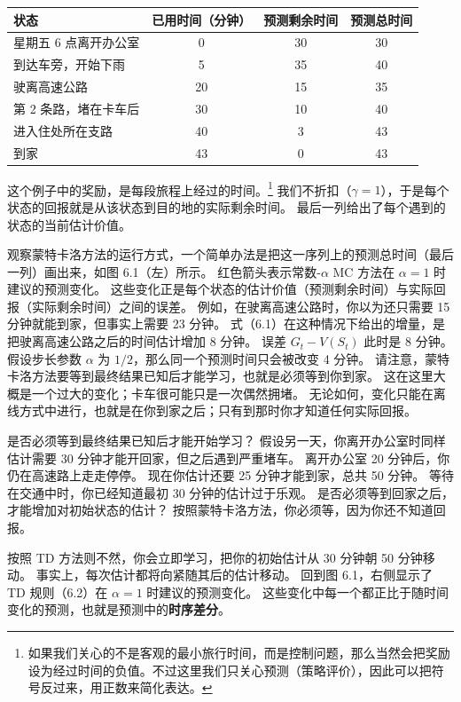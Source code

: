 \documentclass[UTF8, 12pt, fontset=fandol, oneside]{ctexart}
\begin{document}
\begin{center}
\begin{tabular}{lccc}
\toprule
状态 & 已用时间（分钟） & 预测剩余时间 & 预测总时间 \\
\midrule
星期五 6 点离开办公室 & 0 & 30 & 30 \\
到达车旁，开始下雨 & 5 & 35 & 40 \\
驶离高速公路 & 20 & 15 & 35 \\
第 2 条路，堵在卡车后 & 30 & 10 & 40 \\
进入住处所在支路 & 40 & 3 & 43 \\
到家 & 43 & 0 & 43 \\
\bottomrule
\end{tabular}
\end{center}

这个例子中的奖励，是每段旅程上经过的时间。\footnote{如果我们关心的不是客观的最小旅行时间，而是控制问题，那么当然会把奖励设为经过时间的负值。不过这里我们只关心预测（策略评价），因此可以把符号反过来，用正数来简化表达。}
我们不折扣（$\gamma=1$），于是每个状态的回报就是从该状态到目的地的实际剩余时间。
最后一列给出了每个遇到的状态的当前估计价值。

观察蒙特卡洛方法的运行方式，一个简单办法是把这一序列上的预测总时间（最后一列）画出来，如图 6.1（左）所示。
红色箭头表示常数-$\alpha$ MC 方法在 $\alpha=1$ 时建议的预测变化。
这些变化正是每个状态的估计价值（预测剩余时间）与实际回报（实际剩余时间）之间的误差。
例如，在驶离高速公路时，你以为还只需要 15 分钟就能到家，但事实上需要 23 分钟。
式（6.1）在这种情况下给出的增量，是把驶离高速公路之后的时间估计增加 8 分钟。
误差 $G_t-V(S_t)$ 此时是 8 分钟。
假设步长参数 $\alpha$ 为 $1/2$，那么同一个预测时间只会被改变 4 分钟。
请注意，蒙特卡洛方法要等到最终结果已知后才能学习，也就是必须等到你到家。
这在这里大概是一个过大的变化；卡车很可能只是一次偶然拥堵。
无论如何，变化只能在离线方式中进行，也就是在你到家之后；只有到那时你才知道任何实际回报。

是否必须等到最终结果已知后才能开始学习？
假设另一天，你离开办公室时同样估计需要 30 分钟才能开回家，但之后遇到严重堵车。
离开办公室 20 分钟后，你仍在高速路上走走停停。
现在你估计还要 25 分钟才能到家，总共 50 分钟。
等待在交通中时，你已经知道最初 30 分钟的估计过于乐观。
是否必须等到回家之后，才能增加对初始状态的估计？
按照蒙特卡洛方法，你必须等，因为你还不知道回报。

按照 TD 方法则不然，你会立即学习，把你的初始估计从 30 分钟朝 50 分钟移动。
事实上，每次估计都将向紧随其后的估计移动。
回到图 6.1，右侧显示了 TD 规则（6.2）在 $\alpha=1$ 时建议的预测变化。
这些变化中每一个都正比于随时间变化的预测，也就是预测中的\textbf{时序差分}。
\end{document}
